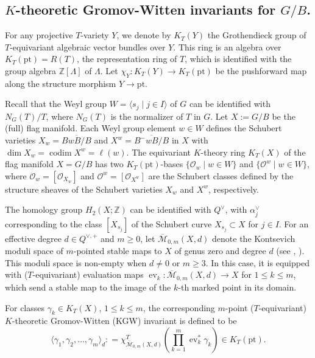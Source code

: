 \documentclass[11pt,a4paper,reqno,dvipdfmx]{amsart}
\numberwithin{equation}{section}
\newcommand{\BZ}{\mathbb{Z}}
\newcommand{\CO}{\mathcal{O}}
\newcommand{\CM}{\mathcal{M}}
\DeclareMathOperator{\ev}{ev}
\DeclareMathOperator{\codim}{codim}
\newcommand{\pt}{\mathrm{pt}}
\newcommand{\ol}[1]{\overline{#1}}
\theoremstyle{plain}
\theoremstyle{definition}
\theoremstyle{remark}
\begin{document}
%
\subsection{$K$-theoretic Gromov-Witten invariants for $G/B$.}
\label{subsec:KGW}

For any projective $T$-variety $Y$, we denote by $K_T(Y)$ 
the Grothendieck group of $T$-equivariant algebraic vector bundles over $Y$. 
This ring is an algebra over $K_T(\pt)=R(T)$, 
the representation ring of $T$, which is identified with 
the group algebra $\BZ[\Lambda]$ of $\Lambda$. 
Let $\chi_Y: K_T(Y) \rightarrow K_T(\pt)$ be the pushforward map 
along the structure morphism $Y \rightarrow \pt$. 



Recall that the Weyl group $W= \langle s_j \mid j \in I \rangle$ of $G$ 
can be identified with $N_G(T)/T$, 
where $N_G(T)$ is the normalizer of $T$ in $G$. 
Let $X:=G/B$ be the (full) flag manifold. 
Each Weyl group element $w \in W$ defines 
the Schubert varieties $X_w = \ol{BwB/B}$ and $X^w=\ol{B^{-}wB/B}$ in $X$ 
with $\dim X_w = \codim X^w = \ell(w)$.
%
The equivariant $K$-theory ring $K_T(X)$ of 
the flag manifold $X=G/B$ has two $K_T(\pt)$-bases 
$\bigl\{ \CO_w \mid w \in W \bigr\}$ and 
$\bigl\{ \CO^w \mid w \in W \bigr\}$, 
where $\CO_w=[\CO_{X_w}]$ and $\CO^w=[\CO_{X^w}]$ are the 
Schubert classes defined by the structure sheaves of 
the Schubert varieties $X_w$ and $X^w$, respectively.

The homology group $H_{2}(X; \BZ)$ can be identified 
with $Q^{\vee}$, with $\alpha_j^\vee$ corresponding to 
the class $[X_{s_j}]$ of the Schubert curve $X_{s_j} \subset X$ for $j \in I$. 
For an effective degree $d \in Q^{\vee,+}$ and $m \geq 0$, 
let $\ol{\CM}_{0,m}(X,d)$ denote 
the Kontsevich moduli space of $m$-pointed stable maps to $X$ of 
genus zero and degree $d$ (see \cite{FP}, \cite{Tho}). 
This moduli space is non-empty when $d\neq 0$ or $m\geq 3$. 
In this case, it is equipped with ($T$-equivariant) evaluation maps 
$\ev_k:\ol{\CM}_{0,m}(X,d) \rightarrow X$ for $1 \leq k\leq m$, 
which send a stable map to the image of the $k$-th marked point in its domain.

For classes 
$\gamma_k \in K_{T}(X)$, $1 \leq k \leq m$, 
the corresponding $m$-point ($T$-equivariant) 
$K$-theoretic Gromov-Witten (KGW) invariant is defined to be
%
\begin{equation*}
\langle \gamma_1, \gamma_2, \ldots , \gamma_m \rangle_d : = 
\chi^{T}_{\ol{\CM}_{0,m}(X,d)}\left(\prod_{k=1}^m\ev_k^*\gamma_k \right) 
\in K_{T}(\pt).
\end{equation*}
%
\end{document}

